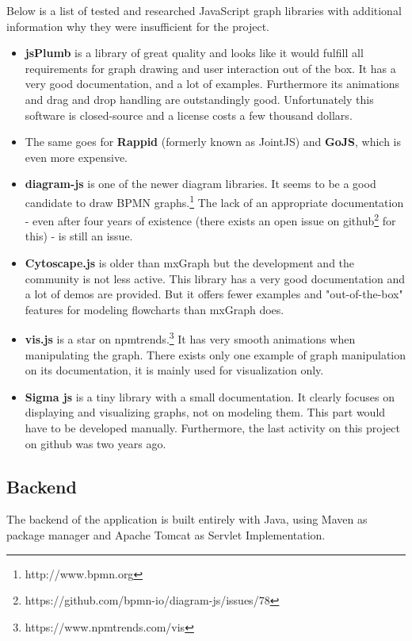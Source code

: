 \documentclass[a4paper,12pt,pdftex,halfparskip,cleardoubleempty,bibtotoc,liststotoc]{scrbook}
\begin{document}
Below is a list of tested and researched JavaScript graph libraries with additional information why they were insufficient for the project.
\begin{itemize}
	\item \textbf{jsPlumb} is a library of great quality and looks like it would fulfill all  requirements for graph drawing and user interaction out of the box. It has a very good documentation, and a lot of examples. Furthermore its animations and drag and drop handling are outstandingly good. Unfortunately this software is closed-source and a license costs a few thousand dollars.
	\item The same goes for \textbf{Rappid} (formerly known as JointJS) and \textbf{GoJS}, which is even more expensive.
	\item \textbf{diagram-js} is one of the newer diagram libraries. It seems to be a good candidate to draw BPMN graphs.\footnote{http://www.bpmn.org} The lack of an appropriate documentation - even after four years of existence (there exists an open issue on github\footnote{https://github.com/bpmn-io/diagram-js/issues/78} for this) - is still an issue.
	\item \textbf{Cytoscape.js} is older than mxGraph but the development and the community is not less active. This library has a very good documentation and a lot of demos are provided. But it offers fewer examples and "out-of-the-box" features for modeling flowcharts than mxGraph does.
	\item \textbf{vis.js} is a star on npmtrends.\footnote{https://www.npmtrends.com/vis}  It has very smooth animations when manipulating the graph. There exists only one example of graph manipulation on its documentation, it is mainly used for visualization only.
	\item \textbf{Sigma js} is a tiny library with a small documentation. It clearly focuses on displaying and visualizing graphs, not on modeling them. This part would have to be developed manually. Furthermore, the last activity on this project on github was two years ago.
\end{itemize}


\subsection{Backend}

The backend  of the application is built entirely with Java, using Maven as package manager and Apache Tomcat as Servlet Implementation.
\end{document}
